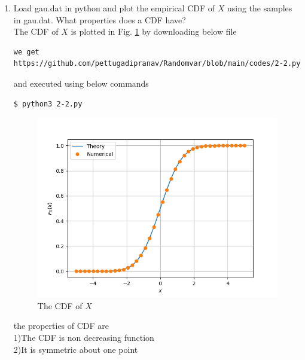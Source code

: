 \documentclass[journal,12pt,twocolumn]{IEEEtran}
\renewcommand\thesection{\arabic{section}}
\begin{document}
\begin{enumerate}[label=\thesection.\arabic*
,ref=\thesection.\theenumi]
\item Load gau.dat in python and plot the empirical CDF of $X$ using the samples in gau.dat. What properties does a CDF have?\\
\solution The CDF of $X$ is plotted in Fig. \ref{fig:gauss_cdf} by downloading below file
\begin{lstlisting}
we get https://github.com/pettugadipranav/Randomvar/blob/main/codes/2-2.py
\end{lstlisting}
and executed using below commands
\begin{lstlisting}
$ python3 2-2.py
\end{lstlisting}
\begin{figure}[!h]
\centering
\includegraphics[width=\columnwidth]{./figs/2-2}
\caption{The CDF of $X$}
\label{fig:gauss_cdf}
\end{figure}
the properties of CDF are\\
1)The CDF is non decreasing function\\
2)It is symmetric about one point\\




\end{enumerate}
\end{document}
